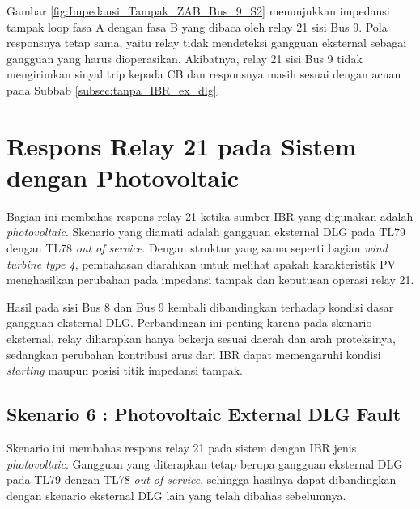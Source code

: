 Gambar \ref{fig:Impedansi_Tampak_ZAB_Bus_9_S2} menunjukkan impedansi tampak loop fasa A dengan fasa B yang dibaca oleh relay 21 sisi Bus 9. Pola responsnya tetap sama, yaitu relay tidak mendeteksi gangguan eksternal sebagai gangguan yang harus dioperasikan. Akibatnya, relay 21 sisi Bus 9 tidak mengirimkan sinyal trip kepada CB dan responsnya masih sesuai dengan acuan pada Subbab \ref{subsec:tanpa_IBR_ex_dlg}.






\section{Respons Relay 21 pada Sistem dengan Photovoltaic}
\label{sec:respon_relay 21_PV}

Bagian ini membahas respons relay 21 ketika sumber IBR yang digunakan adalah \textit{photovoltaic}. Skenario yang diamati adalah gangguan eksternal DLG pada TL79 dengan TL78 \textit{out of service}. Dengan struktur yang sama seperti bagian \textit{wind turbine type 4}, pembahasan diarahkan untuk melihat apakah karakteristik PV menghasilkan perubahan pada impedansi tampak dan keputusan operasi relay 21.

Hasil pada sisi Bus 8 dan Bus 9 kembali dibandingkan terhadap kondisi dasar gangguan eksternal DLG. Perbandingan ini penting karena pada skenario eksternal, relay diharapkan hanya bekerja sesuai daerah dan arah proteksinya, sedangkan perubahan kontribusi arus dari IBR dapat memengaruhi kondisi \textit{starting} maupun posisi titik impedansi tampak.

\subsection{Skenario 6 : Photovoltaic External DLG Fault}

Skenario ini membahas respons relay 21 pada sistem dengan IBR jenis \textit{photovoltaic}. Gangguan yang diterapkan tetap berupa gangguan eksternal DLG pada TL79 dengan TL78 \textit{out of service}, sehingga hasilnya dapat dibandingkan dengan skenario eksternal DLG lain yang telah dibahas sebelumnya.


